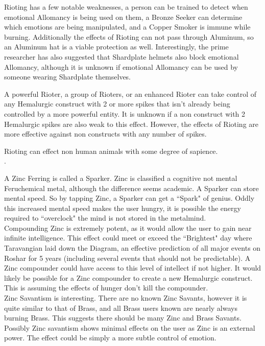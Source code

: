 \documentclass[conference]{IEEEtran}
\begin{document}
Rioting has a few notable weaknesses, a person can be trained to detect when emotional Allomancy is being used on them, a Bronze Seeker can determine which emotions are being manipulated, and a Copper Smoker is immune while burning.  Additionally the effects of Rioting can not pass through Aluminum, so an Aluminum hat is a viable protection as well.  Interestingly, the prime researcher has also suggested that Shardplate helmets also block emotional Allomancy, although it is unknown if emotional Allomancy can be used by someone wearing Shardplate themselves.

A powerful Rioter, a group of Rioters, or an enhanced Rioter can take control of any Hemalurgic construct with 2 or more spikes that isn't already being controlled by a more powerful entity.  It is unknown if a non construct with 2 Hemalurgic spikes are also weak to this effect.  However, the effects of Rioting are more effective against non constructs with any number of spikes.

Rioting can effect non human animals with some degree of sapience.\\.

A Zinc Ferring is called a Sparker.  Zinc is classified a cognitive not mental Feruchemical metal, although the difference seems academic.  A Sparker can store mental speed.  So by tapping Zinc, a Sparker can get a ``Spark" of genius.  Oddly this increased mental speed makes the user hungry, it is possible the energy required to ``overclock" the mind is not stored in the metalmind.\\

Compounding Zinc is extremely potent, as it would allow the user to gain near infinite intelligence.  This effect could meet or exceed the ``Brightest" day where Taravangian laid down the Diagram, an effective prediction of all major events on Roshar for 5 years (including several events that should not be predictable).  A Zinc compounder could have access to this level of intellect if not higher.  It would likely be possible for a Zinc compounder to create a new Hemalurgic construct.  This is assuming the effects of hunger don't kill the compounder.\\

Zinc Savantism is interesting.  There are no known Zinc Savants, however it is quite similar to that of Brass, and all Brass users known are nearly always burning Brass.  This suggests there should be many Zinc and Brass Savants.  Possibly Zinc savantism shows minimal effects on the user as Zinc is an external power.  The effect could be simply a more subtle control of emotion.
\end{document}
